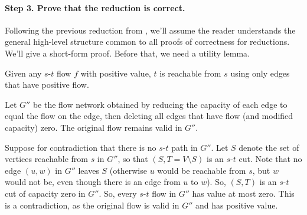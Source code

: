 \paragraph{Step 3.  Prove that the reduction is correct.}
Following the previous reduction from ,
we'll assume the reader understands the general high-level structure
common to all proofs of correctness for reductions.
We'll give a short-form proof. Before that, we need a utility lemma.
\begin{lemma}\label{flow: utility2}
  Given any $s$-$t$ flow $f$ with positive value,
  $t$ is reachable from $s$ using only edges that have positive flow.
\end{lemma}
\begin{shortFormProof}
  Let $G''$ be the flow network obtained by reducing the capacity of each edge to equal the flow on the edge,
  then deleting all edges that have flow (and modified capacity) zero.
  The original flow remains valid in $G''$.
  
  Suppose for contradiction that there is no $s$-$t$ path in $G''$.
  Let $S$ denote the set of vertices reachable from $s$ in $G''$,
  so that $(S, T=V\setminus S)$ is an $s$-$t$ cut.
  Note that no edge $(u,w)$ in $G''$ leaves $S$ (otherwise $u$ would be reachable from $s$,
  but $w$ would not be, even though there is an edge from $u$ to $w$).
  So, $(S, T)$ is an $s$-$t$ cut of capacity zero in $G''$.
  So, every $s$-$t$ flow in $G''$ has value at most zero.
  This is a contradiction, as the original flow is valid in $G''$ and has positive value.
\end{shortFormProof}

